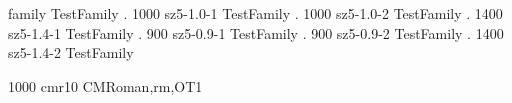 
\newfontattr family   TestFamily
. 1000 sz5-1.0-1 TestFamily
. 1000 sz5-1.0-2 TestFamily
. 1400 sz5-1.4-1 TestFamily
. 900 sz5-0.9-1 TestFamily
. 900 sz5-0.9-2 TestFamily
. 1400 sz5-1.4-2 TestFamily


 1000 cmr10 CMRoman,rm,OT1

\bye
